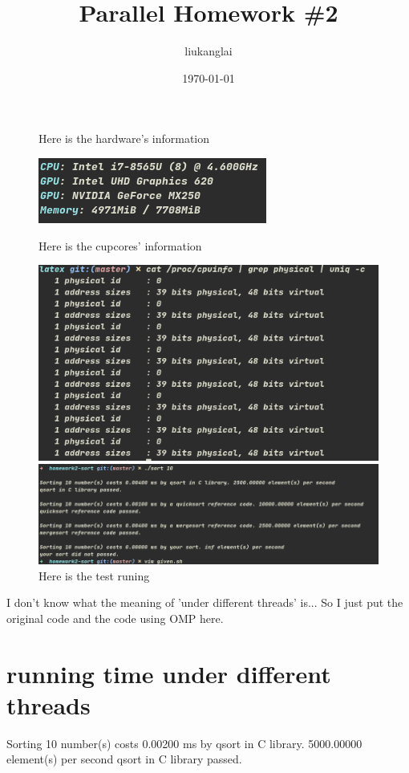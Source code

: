 \documentclass[12pt]{article}
\title{Parallel Homework \#2}
\author{liukanglai}
\date{\today}
\begin{document}
\maketitle

\newpage

\begin{figure}[h]
\centering
\caption{Here is the hardware's information}
\includegraphics[scale=0.5]{HardwareInfo}
\caption{Here is the cupcores' information}
\includegraphics[scale=0.5]{cup_cores}
\caption{Here is the test runing}
\includegraphics[scale=0.5]{testrunning}
\end{figure}



I don't know what the meaning of 'under different threads' is...
So I just put the original code and the code using OMP here.

\newpage
\section{running time under different threads}
Sorting 10 number(s) costs 0.00200 ms by qsort in C library. 5000.00000 element(s) per second
qsort in C library passed.
\end{document}
